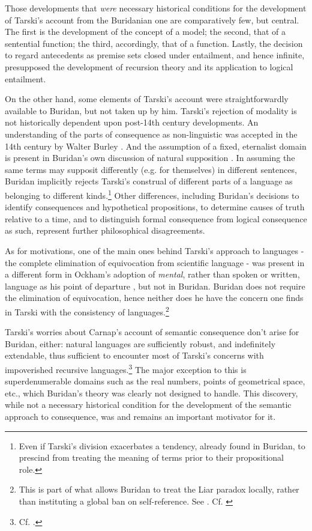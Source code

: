 \documentclass[]{article}
\begin{document}
Those developments that \textit{were} necessary historical conditions for the development of Tarski's account from the Buridanian one are comparatively few, but central. The first is the development of the concept of a model; the second, that of a sentential function; the third, accordingly, that of a function. Lastly, the decision to regard antecedents as premise sets closed under entailment, and hence infinite, presupposed the development of recursion theory and its application to logical entailment.

On the other hand, some elements of Tarski's account were straightforwardly available to Buridan, but not taken up by him. Tarski's rejection of modality is not historically dependent upon post-14th century developments. An understanding of the parts of consequence as non-linguistic was accepted in the 14th century by Walter Burley \cite{Bulthuis2016}. And the assumption of a fixed, eternalist domain is present in Buridan's own discussion of natural supposition \cite[SD 4.3.4]{BuridanKlimaSD}. In assuming the same terms may supposit differently (e.g. for themselves) in different sentences, Buridan implicitly rejects Tarski's construal of different parts of a language as belonging to different kinds.\footnote{Even if Tarski's division exacerbates a tendency, already found in Buridan, to prescind from treating the meaning of terms prior to their propositional role.} Other differences, including Buridan's decisions to identify consequences and hypothetical propositions, to determine causes of truth relative to a time, and to distinguish formal consequence from logical consequence as such, represent further philosophical disagreements.

As for motivations, one of the main ones behind Tarski's approach to languages - the complete elimination of equivocation from scientific language - was present in a different form in Ockham's adoption of \textit{mental}, rather than spoken or written, language as his point of departure \cite{Trentman1970} \cite{Spade1980} \cite{Chalmers1999}, but not in Buridan. Buridan does not require the elimination of equivocation, hence neither does he have the concern one finds in Tarski with the consistency of languages.\footnote{This is part of what allows Buridan to treat the Liar paradox locally, rather than instituting a global ban on self-reference. See \cite[SD 9.2.6]{BuridanKlimaSD}. Cf. \cite{Klima2004} \cite{Klima2008} \cite{DutilhNovaes2011b} \cite{Benetreau-Dupin2015}}

Tarski's worries about Carnap's account of semantic consequence don't arise for Buridan, either: natural languages are sufficiently robust, and indefinitely extendable, thus sufficient to encounter most of Tarski's concerns with impoverished recursive languages.\footnote{Cf. \cite{BarcanMarcus1978}.} The major exception to this is superdenumerable domains such as the real numbers, points of geometrical space, etc., which Buridan's theory was clearly not designed to handle. This discovery, while not a necessary historical condition for the development of the semantic approach to consequence, was and remains an important motivator for it.
\end{document}
